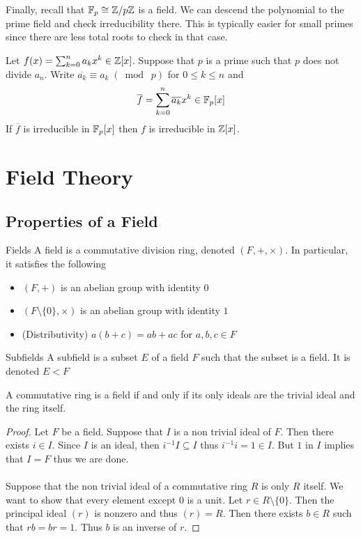\documentclass[a4paper]{article}
\begin{document}
Finally, recall that $\mathbb{F}_p\cong\mathbb{Z}/p\mathbb{Z}$ is a field. We can descend the polynomial to the prime field and check irreducibility there. This is typically easier for small primes since there are less total roots to check in that case. 

\begin{thm}{}{} Let $f(x)=\sum_{k=0}^na_kx^k\in\mathbb{Z}[x]$. Suppose that $p$ is a prime such that $p$ does not divide $a_n$. Write $\overline{a_k}\equiv a_k\;(\bmod\;p)$ for $0\leq k\leq n$ and $$\overline{f}=\sum_{k=0}^n\overline{a_k}x^k\in\mathbb{F}_p[x]$$ If $\overline{f}$ is irreducible in $\mathbb{F}_p[x]$ then $f$ is irreducible in $\mathbb{Z}[x]$. 
\end{thm}


\pagebreak
\section{Field Theory}
\subsection{Properties of a Field}
\begin{defn}{Fields}{} A field is a commutative division ring, denoted $(F,+,\times)$. In particular, it satisfies the following
\begin{itemize}
\item $(F,+)$ is an abelian group with identity $0$
\item $(F\setminus\{0\},\times)$ is an abelian group with identity $1$
\item (Distributivity) $a(b+c)=ab+ac$ for $a,b,c\in F$
\end{itemize}
\end{defn}

\begin{defn}{Subfields}{} A subfield is a subset $E$ of a field $F$ such that the subset is a field. It is denoted $E<F$
\end{defn}

\begin{prp}{}{} A commutative ring is a field if and only if its only ideals are the trivial ideal and the ring itself. \tcbline
\begin{proof}
Let $F$ be a field. Suppose that $I$ is a non trivial ideal of $F$. Then there exists $i\in I$. Since $I$ is an ideal, then $i^{-1}I\subseteq I$ thus $i^{-1}i=1\in I$. But $1$ in $I$ implies that $I=F$ thus we are done. \\~\\
Suppose that the non trivial ideal of a commutative ring $R$ is only $R$ itself. We want to show that every element except $0$ is a unit. Let $r\in R\setminus\{0\}$. Then the principal ideal $(r)$ is nonzero and thus $(r)=R$. Then there exists $b\in R$ such that $rb=br=1$. Thus $b$ is an inverse of $r$. 
\end{proof}
\end{prp}
\end{document}

